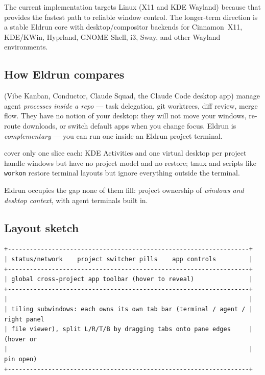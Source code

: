 \documentclass[11pt,a4paper]{article}
\newcommand{\code}[1]{\texttt{#1}}
\begin{document}
The current implementation targets Linux (X11 and KDE Wayland) because that
provides the fastest path to reliable window control. The longer-term direction
is a stable Eldrun core with desktop/compositor backends for Cinnamon~X11,
KDE/KWin, Hyprland, GNOME Shell, i3, Sway, and other Wayland environments.

\subsection{How Eldrun compares}

\begin{description}[leftmargin=1.2em,style=nextline]
  \item[Agent orchestrators] (Vibe Kanban, Conductor, Claude Squad, the Claude
  Code desktop app) manage agent \emph{processes inside a repo} --- task
  delegation, git worktrees, diff review, merge flow. They have no notion of
  your desktop: they will not move your windows, re-route downloads, or switch
  default apps when you change focus. Eldrun is \emph{complementary} --- you can
  run one inside an Eldrun project terminal.
  \item[Manual approaches] cover only one slice each: KDE Activities and one
  virtual desktop per project handle windows but have no project model and no
  restore; tmux and scripts like \code{workon} restore terminal layouts but
  ignore everything outside the terminal.
\end{description}

Eldrun occupies the gap none of them fill: project ownership of \emph{windows
and desktop context}, with agent terminals built in.

\subsection{Layout sketch}

\begin{lstlisting}
+------------------------------------------------------------------+
| status/network    project switcher pills    app controls         |
+------------------------------------------------------------------+
| global cross-project app toolbar (hover to reveal)               |
+------------------------------------------------------------------+
|                                                                  |
| tiling subwindows: each owns its own tab bar (terminal / agent / | right panel
| file viewer), split L/R/T/B by dragging tabs onto pane edges     | (hover or
|                                                                  |  pin open)
+------------------------------------------------------------------+
\end{lstlisting}
\end{document}
